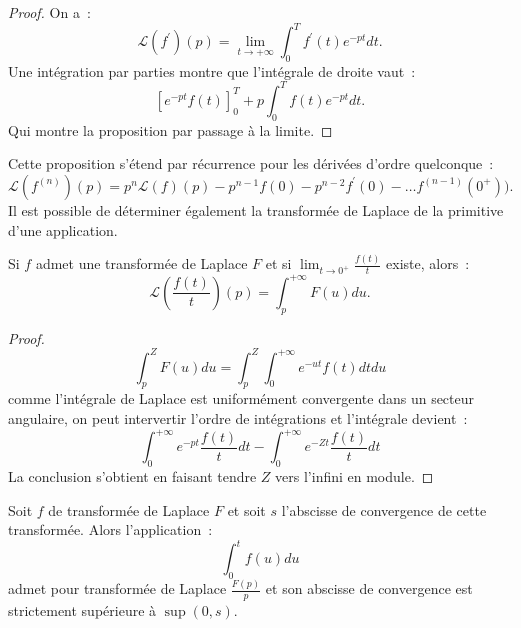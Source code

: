 \begin{proof}
On a~:
\[
\mathcal{L}(f^\prime)(p) = \lim_{t\to + \infty} \int_0^Tf^\prime(t) e^{-pt} dt.
\]
Une intégration par parties montre que l'intégrale de droite vaut~:
\[
\left [
e^{-pt}f(t)
\right ]_0^T
+ p \int_0^T f(t) e^{-pt} dt.
\]
Qui montre la proposition par passage à la limite.
\end{proof}
Cette proposition s'étend par récurrence pour les dérivées d'ordre
quelconque~:
\[
\mathcal{L}(f^{(n)})(p) = p^n \mathcal{L}(f)(p) - p^{n-1} f(0)
- p^{n-2} f^\prime(0) - \dots f^{(n-1)}(0^+)).
\]
Il est possible de déterminer également la transformée de Laplace de
la primitive d'une application.

\begin{fprop}
Si $f$ admet une transformée de Laplace $F$ et si $\lim_{t \to 0^+}
\frac{f(t)}{t}$ existe, alors~:
\[
\mathcal{L} \left( \frac{f(t)}{t} \right) (p) = \int_p^{+\infty} F(u) du.
\]
\end{fprop} 

\begin{proof}
\[
\int_p^Z F(u) du = \int_p^Z \int_0^{+\infty} e^{-ut}
f(t) dt du
\]
comme l'intégrale de Laplace est uniformément convergente dans un
secteur angulaire, on peut intervertir l'ordre de intégrations et
l'intégrale devient~:
\[
\int_0^{+\infty} e^{-pt} \frac{f(t)}{t} dt - \int_0^{+\infty} e^{-Zt} \frac{f(t)}{t} dt
\] 
La conclusion s'obtient en faisant tendre $Z$ vers l'infini en module.
\end{proof}

\begin{fprop}
Soit $f$ de transformée de Laplace $F$ et soit $s$ l'abscisse de
convergence de cette transformée. Alors l'application~:
\[
\int_0^t f(u) du
\]
admet pour transformée de Laplace $\frac{F(p)}{p}$ et son abscisse de
convergence est strictement supérieure à $\sup(0, s)$.
\end{fprop}

